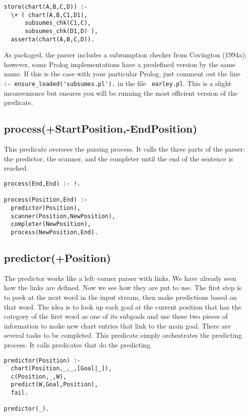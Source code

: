 \documentclass[12pt]{article}
\begin{document}
\begin{verbatim}
store(chart(A,B,C,D)) :-
  \+ ( chart(A,B,C1,D1),
      subsumes_chk(C1,C),
      subsumes_chk(D1,D) ),
  asserta(chart(A,B,C,D)).
\end{verbatim}

As packaged, the parser includes a subsumption checker from Covington (1994a); however, some Prolog implementations have a predefined version by the same name.  If this is the case with your particular Prolog, just comment out the line\verb| :- ensure_loaded('subsumes.pl').| in the file \verb| earley.pl|.  This is a slight inconvenience but ensures you will be running the most efficient version of the predicate.

\subsection{process(+StartPosition,-EndPosition)}
This predicate oversees the parsing process.  It calls the three parts of the parser: the predictor, the scanner, and the completer until the end of the sentence is reached.

\begin{verbatim}
process(End,End) :- !.

process(Position,End) :-
  predictor(Position),
  scanner(Position,NewPosition),
  completer(NewPosition),
  process(NewPosition,End).
\end{verbatim}

\subsection{predictor(+Position)}
The predictor works like a left--corner parser with links.  We have already seen how the links are defined.  Now we see how they are put to use.  The first step is to peek at the next word in the input stream, then make predictions based on that word. The idea is to look up each goal at the current position that has the category of the first word as one of its subgoals and use these two pieces of information to make new chart entries that link to the main goal.  There are several tasks to be completed. This predicate simply orchestrates the predicting process.  It calls predicates that do the predicting.

\begin{verbatim}
predictor(Position) :-
  chart(Position,_,_,[Goal|_]),
  c(Position,_,W),
  predict(W,Goal,Position),
  fail.

predictor(_).
\end{verbatim}
\end{document}
